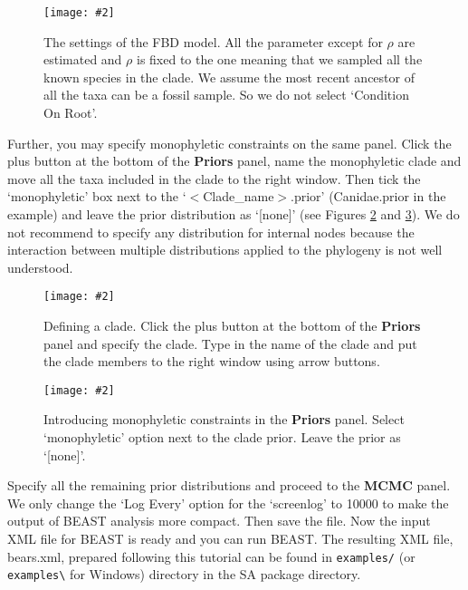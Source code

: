 \documentclass[12pt]{article}
\newcommand{\includeimage}[2][]{%
\texttt{[image: \#2]}
}
\begin{document}
\begin{figure}	
\centering
\includeimage[width=\textwidth]{figures/FBDsettings}
\caption{The settings of the FBD model. All the parameter except for $\rho$ are estimated and $\rho$ is fixed to the one meaning that we sampled all the known species in the clade. We assume the most recent ancestor of all the taxa can be a fossil sample. So we do not select `Condition On Root'. \label{fig:FBDsettings}}
\end{figure}

Further, you may specify monophyletic constraints on the same panel. Click the plus button at the bottom of the {\bf Priors} panel, name the monophyletic clade and move all the taxa included in the clade to the right window. Then tick the `monophyletic' box next to the `$<$Clade\_name$>$.prior' (Canidae.prior in the example) and leave the prior distribution as `[none]' (see Figures \ref{fig:MonophyleticClade} and \ref{fig:MonophyleticConstraint}). We do not recommend to specify any distribution for internal nodes because the interaction between multiple distributions applied to the phylogeny is not well understood.
 
\begin{figure}	
\centering
\includeimage[width=\textwidth]{figures/MonophyleticClade}
\caption{Defining a clade. Click the plus button at the bottom of the {\bf Priors} panel and specify the clade. Type in the name of the clade and put the clade members to the right window using arrow buttons. \label{fig:MonophyleticClade}}
\end{figure}

\begin{figure}	
\centering
\includeimage[width=\textwidth]{figures/MonophyleticConstraint}
\caption{Introducing monophyletic constraints in the {\bf Priors} panel. Select `monophyletic' option next to the clade prior. Leave the prior as `[none]'. \label{fig:MonophyleticConstraint}}
\end{figure}

Specify all the remaining prior distributions and proceed to the {\bf MCMC} panel. We only change the `Log Every' option for the `screenlog' to 10000 to make the output of BEAST analysis more compact. Then save the file. Now the input XML file for BEAST is ready and you can run BEAST. The resulting XML file, bears.xml, prepared following this tutorial can be found in {\tt examples/} (or {\tt examples\textbackslash} for Windows) directory in the SA package directory. 
\end{document}
